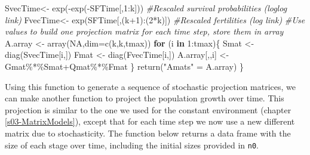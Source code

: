 \documentclass[
]{book}
\newenvironment{Shaded}{\begin{snugshade}}{\end{snugshade}}
\newcommand{\AttributeTok}[1]{\textcolor[rgb]{0.77,0.63,0.00}{#1}}
\newcommand{\CommentTok}[1]{\textcolor[rgb]{0.56,0.35,0.01}{\textit{#1}}}
\newcommand{\ConstantTok}[1]{\textcolor[rgb]{0.00,0.00,0.00}{#1}}
\newcommand{\ControlFlowTok}[1]{\textcolor[rgb]{0.13,0.29,0.53}{\textbf{#1}}}
\newcommand{\DecValTok}[1]{\textcolor[rgb]{0.00,0.00,0.81}{#1}}
\newcommand{\FunctionTok}[1]{\textcolor[rgb]{0.00,0.00,0.00}{#1}}
\newcommand{\NormalTok}[1]{#1}
\newcommand{\OtherTok}[1]{\textcolor[rgb]{0.56,0.35,0.01}{#1}}
\newcommand{\SpecialCharTok}[1]{\textcolor[rgb]{0.00,0.00,0.00}{#1}}
\newcommand{\StringTok}[1]{\textcolor[rgb]{0.31,0.60,0.02}{#1}}
\begin{document}
\begin{Shaded}
\begin{Highlighting}[]
\NormalTok{  SvecTime}\OtherTok{\textless{}{-}}   \FunctionTok{exp}\NormalTok{(}\SpecialCharTok{{-}}\FunctionTok{exp}\NormalTok{(}\SpecialCharTok{{-}}\NormalTok{SFTime[,}\DecValTok{1}\SpecialCharTok{:}\NormalTok{k])) }\CommentTok{\#Rescaled survival probabilities (loglog link)}
\NormalTok{  FvecTime}\OtherTok{\textless{}{-}} \FunctionTok{exp}\NormalTok{(SFTime[,(k}\SpecialCharTok{+}\DecValTok{1}\NormalTok{)}\SpecialCharTok{:}\NormalTok{(}\DecValTok{2}\SpecialCharTok{*}\NormalTok{k)]) }\CommentTok{\#Rescaled fertilities  (log link)}
\CommentTok{\#Use values to build one projection matrix for each time step, store them in  array}
\NormalTok{  A.array }\OtherTok{\textless{}{-}} \FunctionTok{array}\NormalTok{(}\ConstantTok{NA}\NormalTok{,}\AttributeTok{dim=}\FunctionTok{c}\NormalTok{(k,k,tmax))}
  \ControlFlowTok{for}\NormalTok{ (i }\ControlFlowTok{in} \DecValTok{1}\SpecialCharTok{:}\NormalTok{tmax)\{}
\NormalTok{    Smat }\OtherTok{\textless{}{-}} \FunctionTok{diag}\NormalTok{(SvecTime[i,])}
\NormalTok{    Fmat }\OtherTok{\textless{}{-}} \FunctionTok{diag}\NormalTok{(FvecTime[i,])}
\NormalTok{    A.array[,,i] }\OtherTok{\textless{}{-}}\NormalTok{   Gmat}\SpecialCharTok{\%*\%}\NormalTok{Smat}\SpecialCharTok{+}\NormalTok{Qmat}\SpecialCharTok{\%*\%}\NormalTok{Fmat}
\NormalTok{  \}}
\FunctionTok{return}\NormalTok{(}\StringTok{"Amats"} \OtherTok{=}\NormalTok{ A.array)}
\NormalTok{\}}
\end{Highlighting}
\end{Shaded}

Using this function to generate a sequence of stochastic projection matrices, we can make another function to project the population growth over time. This projection is similar to the one we used for the constant environment (chapter \ref{s03-MatrixModels}), except that for each time step we now use a new different matrix due to stochasticity. The function below returns a data frame with the size of each stage over time, including the initial sizes provided in \texttt{n0}.
\end{document}
